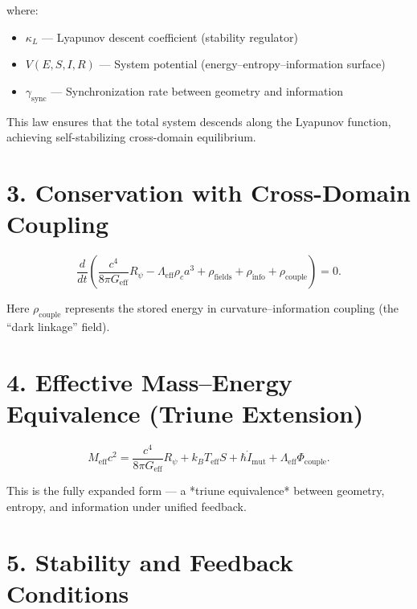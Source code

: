 \documentclass{article}
\begin{document}
where:
\begin{itemize}
    \item $\kappa_L$ — Lyapunov descent coefficient (stability regulator)
    \item $V(E,S,I,R)$ — System potential (energy–entropy–information surface)
    \item $\gamma_{\text{sync}}$ — Synchronization rate between geometry and information
\end{itemize}

This law ensures that the total system descends along the Lyapunov function, achieving self-stabilizing cross-domain equilibrium.

\vspace{1em}

\section*{3. Conservation with Cross-Domain Coupling}

\begin{equation}
\frac{d}{dt} \left(
    \frac{c^4}{8 \pi G_{\text{eff}}}R_{\psi}
    - \Lambda_{\text{eff}} \rho_c a^3
    + \rho_{\text{fields}}
    + \rho_{\text{info}}
    + \rho_{\text{couple}}
\right) = 0.
\end{equation}

Here $\rho_{\text{couple}}$ represents the stored energy in curvature–information coupling (the “dark linkage” field).

\vspace{1em}

\section*{4. Effective Mass–Energy Equivalence (Triune Extension)}

\begin{equation}
M_{\text{eff}} c^2 = 
    \frac{c^4}{8 \pi G_{\text{eff}}} R_{\psi}
    + k_B T_{\text{eff}} S
    + \hbar \dot{I}_{\text{mut}}
    + \Lambda_{\text{eff}} \Phi_{\text{couple}}.
\end{equation}

\noindent
This is the fully expanded form — a *triune equivalence* between geometry, entropy, and information under unified feedback.

\vspace{1em}

\section*{5. Stability and Feedback Conditions}
\end{document}
